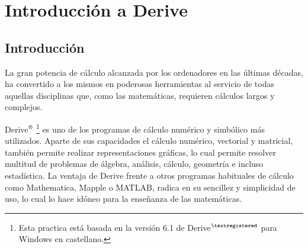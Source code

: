 
\chapter{Introducción a Derive}

\section{Introducción}
La gran potencia de cálculo alcanzada por los ordenadores en las
últimas décadas, ha convertido a los mismos en poderosas
herramientas al servicio de todas aquellas disciplinas que, como las
matemáticas, requieren cálculos largos y complejos.

Derive$^{\textsf{\textregistered}}$
\renewcommand{\thefootnote}{\fnsymbol{footnote}}\footnote{Esta
practica está basada en la versión 6.1 de
Derive$^{\textregistered}$ para Windows en castellano.} es uno de
los programas de cálculo numérico y simbólico más utilizados.
Aparte de sus capacidades el cálculo numérico, vectorial y
matricial, también permite realizar representaciones gráficas, lo
cual permite resolver multitud de problemas de álgebra, análisis,
cálculo, geometría e incluso estadística. La ventaja de Derive
frente a otros programas habituales de cálculo como Mathematica,
Mapple o MATLAB, radica en su sencillez y simplicidad de uso, lo
cual lo hace idóneo para la enseñanza de las matemáticas.


